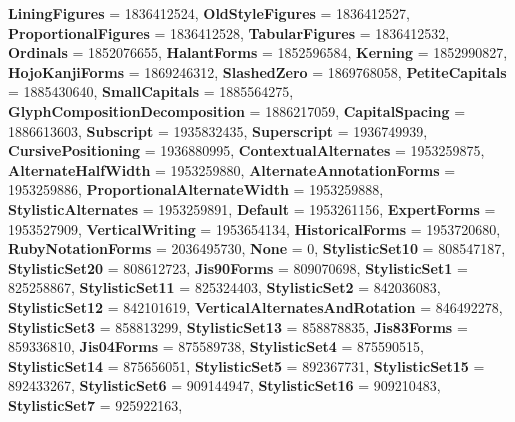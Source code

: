 \begin{DoxyCompactItemize}
{\bfseries Lining\+Figures} = 1836412524, 
{\bfseries Old\+Style\+Figures} = 1836412527, 
\newline
{\bfseries Proportional\+Figures} = 1836412528, 
{\bfseries Tabular\+Figures} = 1836412532, 
{\bfseries Ordinals} = 1852076655, 
{\bfseries Halant\+Forms} = 1852596584, 
\newline
{\bfseries Kerning} = 1852990827, 
{\bfseries Hojo\+Kanji\+Forms} = 1869246312, 
{\bfseries Slashed\+Zero} = 1869768058, 
{\bfseries Petite\+Capitals} = 1885430640, 
\newline
{\bfseries Small\+Capitals} = 1885564275, 
{\bfseries Glyph\+Composition\+Decomposition} = 1886217059, 
{\bfseries Capital\+Spacing} = 1886613603, 
{\bfseries Subscript} = 1935832435, 
\newline
{\bfseries Superscript} = 1936749939, 
{\bfseries Cursive\+Positioning} = 1936880995, 
{\bfseries Contextual\+Alternates} = 1953259875, 
{\bfseries Alternate\+Half\+Width} = 1953259880, 
\newline
{\bfseries Alternate\+Annotation\+Forms} = 1953259886, 
{\bfseries Proportional\+Alternate\+Width} = 1953259888, 
{\bfseries Stylistic\+Alternates} = 1953259891, 
{\bfseries Default} = 1953261156, 
\newline
{\bfseries Expert\+Forms} = 1953527909, 
{\bfseries Vertical\+Writing} = 1953654134, 
{\bfseries Historical\+Forms} = 1953720680, 
{\bfseries Ruby\+Notation\+Forms} = 2036495730, 
\newline
{\bfseries None} = 0, 
{\bfseries Stylistic\+Set10} = 808547187, 
{\bfseries Stylistic\+Set20} = 808612723, 
{\bfseries Jis90\+Forms} = 809070698, 
\newline
{\bfseries Stylistic\+Set1} = 825258867, 
{\bfseries Stylistic\+Set11} = 825324403, 
{\bfseries Stylistic\+Set2} = 842036083, 
{\bfseries Stylistic\+Set12} = 842101619, 
\newline
{\bfseries Vertical\+Alternates\+And\+Rotation} = 846492278, 
{\bfseries Stylistic\+Set3} = 858813299, 
{\bfseries Stylistic\+Set13} = 858878835, 
{\bfseries Jis83\+Forms} = 859336810, 
\newline
{\bfseries Jis04\+Forms} = 875589738, 
{\bfseries Stylistic\+Set4} = 875590515, 
{\bfseries Stylistic\+Set14} = 875656051, 
{\bfseries Stylistic\+Set5} = 892367731, 
\newline
{\bfseries Stylistic\+Set15} = 892433267, 
{\bfseries Stylistic\+Set6} = 909144947, 
{\bfseries Stylistic\+Set16} = 909210483, 
{\bfseries Stylistic\+Set7} = 925922163, 
\newline

\end{DoxyCompactItemize}
